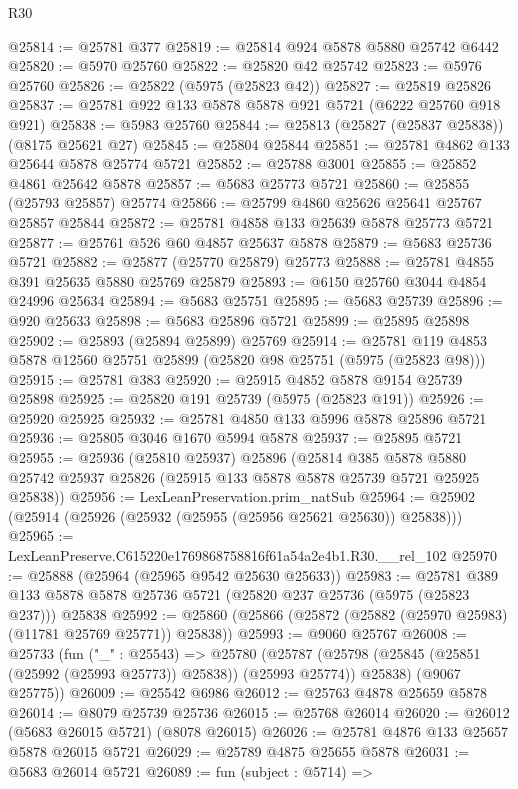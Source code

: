 \begin{lexlean}{R30}
\begin{coremodule}
@25814 := @25781 @377
@25819 := @25814 @924 @5878 @5880 @25742 @6442
@25820 := @5970 @25760
@25822 := @25820 @42 @25742
@25823 := @5976 @25760
@25826 := @25822 (@5975 (@25823 @42))
@25827 := @25819 @25826
@25837 := @25781 @922 @133 @5878 @5878 @921 @5721 (@6222 @25760 @918 @921)
@25838 := @5983 @25760
@25844 := @25813 (@25827 (@25837 @25838)) (@8175 @25621 @27)
@25845 := @25804 @25844
@25851 := @25781 @4862 @133 @25644 @5878 @25774 @5721
@25852 := @25788 @3001
@25855 := @25852 @4861 @25642 @5878
@25857 := @5683 @25773 @5721
@25860 := @25855 (@25793 @25857) @25774
@25866 := @25799 @4860 @25626 @25641 @25767 @25857 @25844
@25872 := @25781 @4858 @133 @25639 @5878 @25773 @5721
@25877 := @25761 @526 @60 @4857 @25637 @5878
@25879 := @5683 @25736 @5721
@25882 := @25877 (@25770 @25879) @25773
@25888 := @25781 @4855 @391 @25635 @5880 @25769 @25879
@25893 := @6150 @25760 @3044 @4854 @24996 @25634
@25894 := @5683 @25751
@25895 := @5683 @25739
@25896 := @920 @25633
@25898 := @5683 @25896 @5721
@25899 := @25895 @25898
@25902 := @25893 (@25894 @25899) @25769
@25914 := @25781 @119 @4853 @5878 @12560 @25751 @25899 (@25820 @98 @25751 (@5975 (@25823 @98)))
@25915 := @25781 @383
@25920 := @25915 @4852 @5878 @9154 @25739 @25898
@25925 := @25820 @191 @25739 (@5975 (@25823 @191))
@25926 := @25920 @25925
@25932 := @25781 @4850 @133 @5996 @5878 @25896 @5721
@25936 := @25805 @3046 @1670 @5994 @5878
@25937 := @25895 @5721
@25955 := @25936
    (@25810 @25937)
    @25896
    (@25814
      @385
      @5878
      @5880
      @25742
      @25937
      @25826
      (@25915 @133 @5878 @5878 @25739 @5721 @25925 @25838))
@25956 := LexLeanPreservation.prim_natSub
@25964 := @25902 (@25914 (@25926 (@25932 (@25955 (@25956 @25621 @25630)) @25838)))
@25965 := LexLeanPreserve.C615220e1769868758816f61a54a2e4b1.R30.__rel_102
@25970 := @25888 (@25964 (@25965 @9542 @25630 @25633))
@25983 := @25781
    @389
    @133
    @5878
    @5878
    @25736
    @5721
    (@25820 @237 @25736 (@5975 (@25823 @237)))
    @25838
@25992 := @25860 (@25866 (@25872 (@25882 (@25970 @25983) (@11781 @25769 @25771)) @25838))
@25993 := @9060 @25767
@26008 := @25733
    (fun ("_" : @25543) =>
    @25780
      (@25787 (@25798 (@25845 (@25851 (@25992 (@25993 @25773)) @25838)) (@25993 @25774)) @25838)
      (@9067 @25775))
@26009 := @25542 @6986
@26012 := @25763 @4878 @25659 @5878
@26014 := @8079 @25739 @25736
@26015 := @25768 @26014
@26020 := @26012 (@5683 @26015 @5721) (@8078 @26015)
@26026 := @25781 @4876 @133 @25657 @5878 @26015 @5721
@26029 := @25789 @4875 @25655 @5878
@26031 := @5683 @26014 @5721
@26089 := fun (subject : @5714) =>

\end{coremodule}
\end{lexlean}
